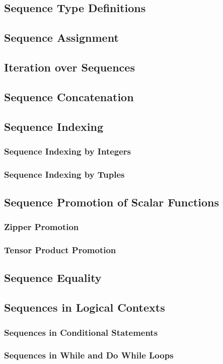 \documentclass[10pt,twoside,titlepage]{article}
\begin{document}
\subsection{Sequence Type Definitions}
\subsection{Sequence Assignment}
\subsection{Iteration over Sequences}
\subsection{Sequence Concatenation}
\subsection{Sequence Indexing}
\subsubsection{Sequence Indexing by Integers}
\subsubsection{Sequence Indexing by Tuples}
\subsection{Sequence Promotion of Scalar Functions}
\subsubsection{Zipper Promotion}
\subsubsection{Tensor Product Promotion}
\subsection{Sequence Equality}
\subsection{Sequences in Logical Contexts}
\subsubsection{Sequences in Conditional Statements}
\subsubsection{Sequences in While and Do While Loops}
\end{document}
